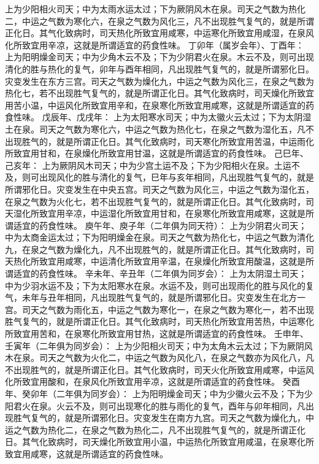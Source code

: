 \documentclass[a4paper,12pt,UTF8,twoside]{ctexbook}
\begin{document}
上为少阳相火司天；中为太雨水运太过；下为厥阴风木在泉。司天之气数为热化二，中运之气数为寒化六，在泉之气数为风化三，凡不出现胜气复气的，就是所谓正化日。其气化致病时，司天热化所致宜用咸寒，中运寒化所致宜用咸湿，在泉风化所致宜用辛凉，这就是所谓适宜的药食性味。
丁卯年（属岁会年）、丁酉年：
上为阳明燥金司天；中为少角木云不及；下为少阴君火在泉。木云不及，则可出现清化的胜与热化的复气，卯年与酉年相同，凡出现胜气复气的，就是所谓邪化日。灾变发生在东方三宫。司天之气数为燥化九，中运之气数为风化三，在泉之气数为热化七，若不出现胜气复气的，就是所谓正化日。其气化致病时，司天燥化所致宜用苦小温，中运风化所致宜用辛和，在泉寒化所致宜用咸寒，这就是所谓适宜的药食性味。
戊辰年、戊戌年：
上为太阳寒水司天；中为太徽火云太过；下为太阴湿土在泉。司天之气数为寒化六，中运之气数为热化七，在泉之气数为湿化五，凡不出现胜气的，就是所谓正化日。其气化致病时，司天寒化所致宜用苦温，中运雨化所致宜用甘和，在泉燥化所致宜用甘温，这就是所谓适宜的药食性味。
己巳年、己亥年：
上为厥阴风木司天；中为少宫土运不及；下为少阳相火在泉。土运不及，则可出现风化的胜与清化的复气，巳年与亥年相同，凡出现胜气复气的，就是所谓邪化日。灾变发生在中央五宫。司天之气数为风化三，中运之气数为湿化五，在泉之气数为火化七，若不出现胜气复气的，就是所谓正化日。其气化致病时，司天湿化所致宜用辛凉，中运湿化所致宜用甘和，在泉寒化所致宜用咸寒，这就是所谓适宜的药食性味。
庾午年、庾子年（二年俱为同天符）：
上为少阴君火司天；中为太商金运太过；下为阳明燥金在泉。司天之气数为热化七，中运之气数为清化九，在泉之气数为燥化九，凡不出现胜气的，就是所谓正化日。其气化致病时，司天热化所致宜用咸寒，中运清化所致宜用辛温，在泉燥化所致宜用酸温，这就是所谓适宜的药食性味。
辛未年、辛丑年（二年俱为同岁会）：
上为太阴湿土司天；中为少羽水运不及；下为太阳寒水在泉。水运不及，则可出现雨化的胜与风化的复气，未年与丑年相同，凡出现胜气复气的，就是所谓邪化日。灾变发生在北方一宫。司天之气数为雨化五，中运之气数为寒化一，在泉之气数为寒化一，若不出现胜气复气的，就是所谓正化日。其气化致病时，司天热化所致宜用苦热，中运寒化所致宜用苦和，在泉寒化所致宜用甘热，这就是所谓适宜的药食性味。
壬申年、壬寅年（二年俱为同岁会）：
上为少阳相火司天；中为太角木云太过；下为厥阴风木在泉。司天之气数为火化二，中运之气数为风化八，在泉之气数亦为风化八，凡不出现胜气的，就是所谓正化日。其气化致病时，司天火化所致宜用咸寒，中运风化所致宜用酸和，在泉风化所致宜用辛凉，这就是所谓适宜的药食性味。
癸酉年、癸卯年（二年俱为同岁会）：
上为阳明燥金司天；中为少徽火云不及；下为少阳君火在泉。火云不及，则可出现寒化的胜与雨化的复气，酉年与卯年相同，凡出现胜气复气的，就是所谓邪化日。灾变发生在南方九宫。司天之气数为燥化九，中运之气数为热化二，在泉之气数为热化二，凡不出现胜气复气的，就是所谓正化日。其气化致病时，司天燥化所致宜用小温，中运热化所致宜用咸温，在泉寒化所致宜用咸寒，这就是所谓适宜的药食性味。
\end{document}
